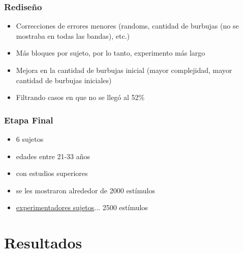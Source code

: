 \documentclass{beamer}
\begin{document}
	\begin{frame}
	\frametitle{Rediseño}
	\begin{itemize}
	\item Correcciones de errores menores (randoms, cantidad de burbujas (no se mostraba en todas las bandas), etc.)
	\item Más bloques por sujeto, por lo tanto, experimento más largo
	\item Mejora en la cantidad de burbujas inicial (mayor complejidad, mayor cantidad de burbujas iniciales)
	\item Filtrando casos en que no se llegó al 52\%
	\end{itemize}

	\end{frame}


	\begin{frame}
	\frametitle{Etapa Final}
	\begin{itemize}
	\item 6 sujetos
	\item edades entre 21-33 años
	\item con estudios superiores
	\item se les mostraron alrededor de 2000 est\'imulos
	\item \underline{experimentadores sujetos}... 2500 est\'imulos
	\end{itemize}
	\end{frame}


  \section{Resultados}
\end{document}
